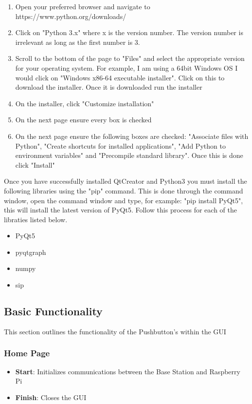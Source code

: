\begin{enumerate}
	\item Open your preferred browser and navigate to https://www.python.org/downloads/
	\item Click on "Python 3.x" where x is the version number. The version number is irrelevant as long as the first number is 3. 
	\item Scroll to the bottom of the page to "Files" and select the appropriate version for your operating system. For example, I am using a 64bit Windows OS I would click on "Windows x86-64 executable installer". Click on this to download the installer. Once it is downloaded run the installer
	\item On the installer, click "Customize installation"
	\item On the next page ensure every box is checked
	\item On the next page ensure the following boxes are checked: "Associate files with Python", "Create shortcuts for installed applications", "Add Python to environment variables" and "Precompile standard library". Once this is done click "Install"
\end{enumerate}

Once you have successfully installed QtCreator and Python3 you must install the following libraries using the "pip" command. This is done through the command window, open the command window and type, for example: "pip install PyQt5", this will install the latest version of PyQt5. Follow this process for each of the libraties listed below.

\begin{itemize}
	\item PyQt5
	\item pyqtgraph
	\item numpy
	\item sip
\end{itemize}

\subsection{Basic Functionality}
This section outlines the functionality of the Pushbutton's within the GUI

\subsubsection{Home Page}
\begin{itemize}
	\item \textbf{Start}: Initializes communications between the Base Station and Raspberry Pi
	\item \textbf{Finish}: Closes the GUI
\end{itemize}

